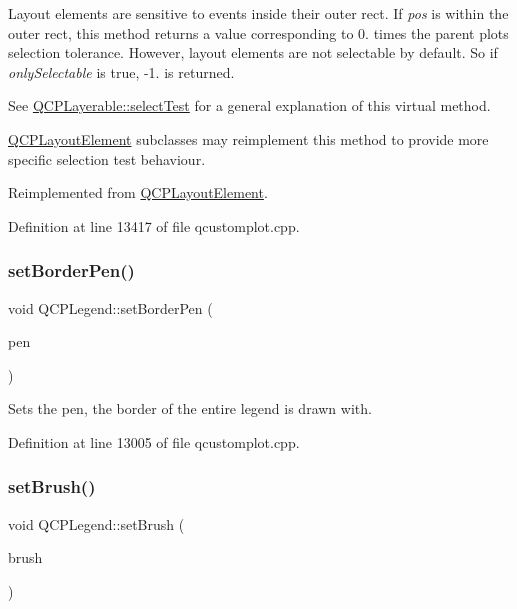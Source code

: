 Layout elements are sensitive to events inside their outer rect. If {\itshape pos} is within the outer rect, this method returns a value corresponding to 0. times the parent plot\textquotesingle{}s selection tolerance. However, layout elements are not selectable by default. So if {\itshape only\+Selectable} is true, -\/1. is returned.

See \hyperlink{class_q_c_p_layerable_a04db8351fefd44cfdb77958e75c6288e}{Q\+C\+P\+Layerable\+::select\+Test} for a general explanation of this virtual method.

\hyperlink{class_q_c_p_layout_element}{Q\+C\+P\+Layout\+Element} subclasses may reimplement this method to provide more specific selection test behaviour. 

Reimplemented from \hyperlink{class_q_c_p_layout_element_a0b96ae0d7bcfa6e38188fcb1e73e143f}{Q\+C\+P\+Layout\+Element}.



Definition at line 13417 of file qcustomplot.\+cpp.

\mbox{\label{class_q_c_p_legend_a866a9e3f5267de7430a6c7f26a61db9f}} 
\subsubsection{\texorpdfstring{set\+Border\+Pen()}{setBorderPen()}}
{\footnotesize\ttfamily void Q\+C\+P\+Legend\+::set\+Border\+Pen (\begin{DoxyParamCaption}\item[{const Q\+Pen \&}]{pen }\end{DoxyParamCaption})}

Sets the pen, the border of the entire legend is drawn with. 

Definition at line 13005 of file qcustomplot.\+cpp.

\mbox{\label{class_q_c_p_legend_a497bbcd38baa3598c08e2b3f48103f23}} 
\subsubsection{\texorpdfstring{set\+Brush()}{setBrush()}}
{\footnotesize\ttfamily void Q\+C\+P\+Legend\+::set\+Brush (\begin{DoxyParamCaption}\item[{const Q\+Brush \&}]{brush }\end{DoxyParamCaption})}

